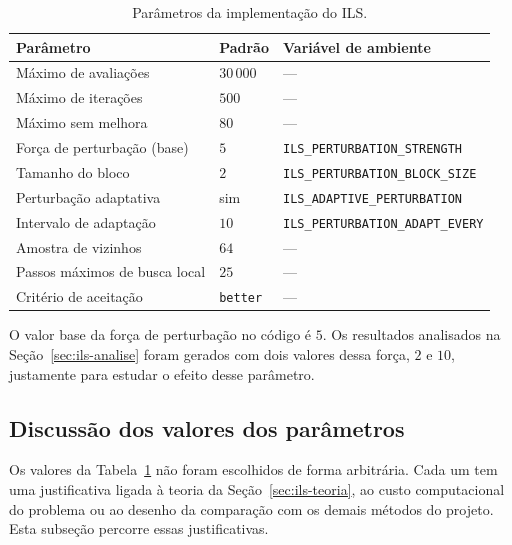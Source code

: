 \documentclass[11pt,a4paper]{article}
\newcommand{\code}[1]{\texttt{#1}}
\begin{document}
\begin{table}[h]
\centering
\caption{Parâmetros da implementação do ILS.}
\label{tab:parametros}
\begin{tabular}{@{}lll@{}}
\toprule
Parâmetro & Padrão & Variável de ambiente \\
\midrule
Máximo de avaliações & $30\,000$ & --- \\
Máximo de iterações & $500$ & --- \\
Máximo sem melhora & $80$ & --- \\
Força de perturbação (base) & $5$ & \code{ILS\_PERTURBATION\_STRENGTH} \\
Tamanho do bloco & $2$ & \code{ILS\_PERTURBATION\_BLOCK\_SIZE} \\
Perturbação adaptativa & sim & \code{ILS\_ADAPTIVE\_PERTURBATION} \\
Intervalo de adaptação & $10$ & \code{ILS\_PERTURBATION\_ADAPT\_EVERY} \\
Amostra de vizinhos & $64$ & --- \\
Passos máximos de busca local & $25$ & --- \\
Critério de aceitação & \code{better} & --- \\
\bottomrule
\end{tabular}
\end{table}

O valor base da força de perturbação no código é $5$. Os resultados analisados na Seção~\ref{sec:ils-analise} foram gerados com dois valores dessa força, $2$ e $10$, justamente para estudar o efeito desse parâmetro.

\subsection{Discussão dos valores dos parâmetros}
\label{sec:ils-parametros}

Os valores da Tabela~\ref{tab:parametros} não foram escolhidos de forma arbitrária. Cada um tem uma justificativa ligada à teoria da Seção~\ref{sec:ils-teoria}, ao custo computacional do problema ou ao desenho da comparação com os demais métodos do projeto. Esta subseção percorre essas justificativas.
\end{document}
